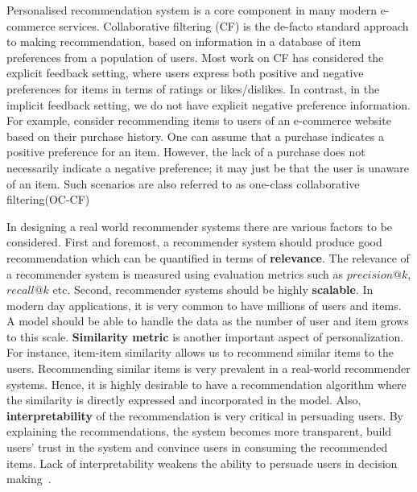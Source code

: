 Personalised recommendation system is a core component
in many modern e-commerce services. Collaborative
filtering (CF) is the de-facto standard approach to making recommendation,
based on information in a database
of item preferences from a population of users. Most work on CF has considered 
the explicit feedback
setting, where users express both positive and negative preferences
for items in terms of ratings or likes/dislikes. In
contrast, in the implicit feedback setting, we do not have
explicit negative preference information. For example, consider
recommending items to users of an e-commerce website
based on their purchase history. One can assume that a
purchase indicates a positive preference for an item. However,
the lack of a purchase does not necessarily indicate
a negative preference; it may just be that the user is unaware
of an item. Such scenarios are also referred to as one-class collaborative
filtering(OC-CF)



In designing a real world recommender systems there are various factors to be 
considered. First and foremost, a recommender system should  produce good recommendation which can be quantified in terms of \textbf{relevance}. The relevance of a recommender system is measured using evaluation metrics such as $precision@k$, $recall@k$ etc. Second, recommender systems should be highly \textbf{scalable}. In modern day applications, it is very common to have millions of users and items. A model should be able to handle the data as the number of user and item grows to this scale. \textbf{Similarity metric} is another important aspect of personalization. For instance, item-item similarity allows us to recommend similar items to the users. Recommending similar items is very prevalent in a real-world recommender systems. Hence, it is highly desirable to have a recommendation algorithm where the similarity is directly expressed and incorporated in the model. Also, \textbf{interpretability} of the recommendation is very critical in persuading users. By explaining the recommendations, the system becomes more transparent, build users' trust in the system and convince users in consuming the recommended items. Lack of interpretability weakens the ability to persuade users in decision making~\citep{explainabiltyVIG2009}.

